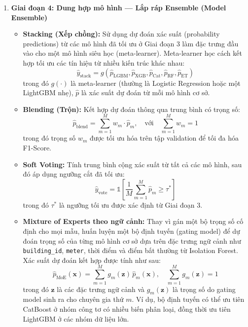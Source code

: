 \begin{enumerate}
    \item \textbf{Giai đoạn 4: Dung hợp mô hình — Lắp ráp Ensemble (Model Ensemble)}
    \begin{itemize}
        \item \textbf{Stacking (Xếp chồng):} Sử dụng dự đoán xác suất (probability predictions) từ các mô hình đã tối ưu ở Giai đoạn 3 làm đặc trưng đầu vào cho một mô hình siêu học (meta-learner). Meta-learner học cách kết hợp tối ưu các tín hiệu từ nhiều kiến trúc khác nhau:
        \begin{equation*}
            \hat{y}_{\text{stack}} = g\left(\hat{p}_{\text{LGBM}}, \hat{p}_{\text{XGB}}, \hat{p}_{\text{Cat}}, \hat{p}_{\text{RF}}, \hat{p}_{\text{ET}}\right)
        \end{equation*}
        trong đó $g(\cdot)$ là meta-learner (thường là Logistic Regression hoặc một LightGBM nhẹ), $\hat{p}$ là xác suất dự đoán từ mỗi mô hình cơ sở.
        \item \textbf{Blending (Trộn):} Kết hợp dự đoán thông qua trung bình có trọng số:
        \begin{equation*}
            \hat{p}_{\text{blend}} = \sum_{m=1}^{M} w_m \cdot \hat{p}_m, \quad \text{với} \quad \sum_{m=1}^{M} w_m = 1
        \end{equation*}
        trong đó trọng số $w_m$ được tối ưu hóa trên tập validation để tối đa hóa F1-Score.
        \item \textbf{Soft Voting:} Tính trung bình cộng xác suất từ tất cả các mô hình, sau đó áp dụng ngưỡng cắt đã tối ưu:
        \begin{equation*}
            \hat{y}_{\text{vote}} = \mathbb{1}\left[\frac{1}{M}\sum_{m=1}^{M} \hat{p}_m \geq \tau^*\right]
        \end{equation*}
        trong đó $\tau^*$ là ngưỡng tối ưu được xác định từ Giai đoạn 3.
        \item \textbf{Mixture of Experts theo ngữ cảnh:} Thay vì gán một bộ trọng số cố định cho mọi mẫu, huấn luyện một bộ định tuyến (gating model) để dự đoán trọng số của từng mô hình cơ sở dựa trên đặc trưng ngữ cảnh như \texttt{building\_id}, \texttt{meter}, thời điểm và điểm bất thường từ Isolation Forest. Xác suất dự đoán kết hợp được tính như sau:
        \begin{equation*}
            \hat{p}_{\text{MoE}}(\mathbf{x}) = \sum_{m=1}^{M} g_m(\mathbf{z})\,\hat{p}_m(\mathbf{x}), \quad \sum_{m=1}^{M} g_m(\mathbf{z}) = 1
        \end{equation*}
        trong đó $\mathbf{z}$ là các đặc trưng ngữ cảnh và $g_m(\mathbf{z})$ là trọng số do gating model sinh ra cho chuyên gia thứ $m$. Ví dụ, bộ định tuyến có thể ưu tiên CatBoost ở nhóm công tơ có nhiều biến phân loại, đồng thời ưu tiên LightGBM ở các nhóm dữ liệu lớn.

\end{itemize}
\end{enumerate}
